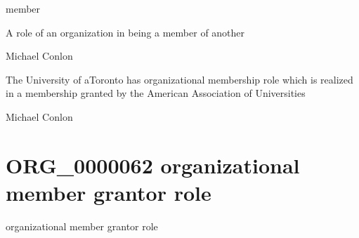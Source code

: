 \documentclass[letterpaper,10pt,english]{sphinxmanual}
\begin{document}
\begin{sphinxShadowBox}

\sphinxAtStartPar
member
\end{sphinxShadowBox}

\begin{sphinxShadowBox}

\sphinxAtStartPar
A role of an organization in being a member of another
\end{sphinxShadowBox}

\begin{sphinxShadowBox}

\sphinxAtStartPar
Michael Conlon 
\end{sphinxShadowBox}

\begin{sphinxShadowBox}

\sphinxAtStartPar
The University of aToronto has organizational membership role which is realized in a membership granted by the American Association of Universities
\end{sphinxShadowBox}

\begin{sphinxShadowBox}

\sphinxAtStartPar
Michael Conlon 
\end{sphinxShadowBox}
\begin{quote}
\label{\detokenize{doc-ORG_0000062:org-0000062}}\label{\detokenize{doc-ORG_0000062:organizational-member-grantor-role}}\label{\detokenize{doc-ORG_0000062:org-0000062}}
\ignorespaces \end{quote}


\section{ORG\_0000062 \sphinxhyphen{} organizational member grantor role}
\label{\detokenize{doc-ORG_0000062:org-0000062-organizational-member-grantor-role}}\label{\detokenize{doc-ORG_0000062:index-0}}\label{\detokenize{doc-ORG_0000062::doc}}
\begin{sphinxShadowBox}

\sphinxAtStartPar
organizational member grantor role
\end{sphinxShadowBox}
\end{document}
